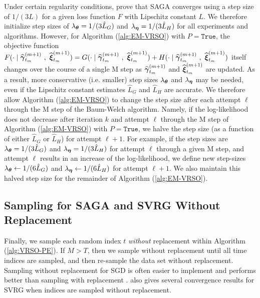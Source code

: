Under certain regularity conditions, \citet{Defazio:2014} prove that SAGA converges using a step size of $1/(3L)$ for a given loss function $F$ with Lipschitz constant $L$. We therefore initialize step sizes of $\lambda_{\boldsymbol{\theta}} = 1/(3 \hat L_G)$ and $\lambda_{\boldsymbol{\eta}} = 1/(3 \hat L_H)$ for all experiments and algorithms. However, for Algorithm (\ref{alg:EM-VRSO}) with $P = \texttt{True}$, the objective function $F(\cdot \mid \widehat {\boldsymbol{\gamma}}_{t_m}^{(m+1)} ~,~ \widehat {\boldsymbol{\xi}}_{t_m}^{(m+1)}) = G(\cdot \mid \widehat {\boldsymbol{\gamma}}_{t_m}^{(m+1)} ~,~ \widehat {\boldsymbol{\xi}}_{t_m}^{(m+1)}) + H(\cdot \mid \widehat {\boldsymbol{\gamma}}_{t_m}^{(m+1)} ~,~ \widehat {\boldsymbol{\xi}}_{t_m}^{(m+1)})$ itself changes over the course of a single M step as $\widehat {\boldsymbol{\gamma}}_{t_m}^{(m+1)}$ and $\widehat {\boldsymbol{\xi}}_{t_m}^{(m+1)}$ are updated. As a result, more conservative (i.e. smaller) step sizes $\lambda_{\boldsymbol{\theta}}$ and $\lambda_{\boldsymbol{\eta}}$ may be needed, even if the Lipschitz constant estimates $\hat L_G$ and $\hat L_H$ are accurate. We therefore allow Algorithm (\ref{alg:EM-VRSO}) to change the step size after each attempt $\ell$ through the M step of the Baum-Welch algorithm. Namely, if the log-likelihood does not decrease after iteration $k$ and attempt $\ell$ through the M step of Algorithm (\ref{alg:EM-VRSO}) with $P = \texttt{True}$, we halve the step size (as a function of either $\hat L_G$ or $\hat L_H$) for attempt $\ell+1$. For example, if the step sizes are $\lambda_{\boldsymbol{\theta}} = 1/(3 \hat L_G)$ and $\lambda_{\boldsymbol{\eta}} = 1/(3 \hat L_H)$ for attempt $\ell$ through a given M step, and attempt $\ell$ results in an increase of the log-likelihood, we define new step-sizes $\lambda_{\boldsymbol{\theta}} \leftarrow 1/(6 \hat L_G)$ and $\lambda_{\boldsymbol{\eta}} \leftarrow 1/(6 \hat L_H)$ for attempt $\ell+1$. We also maintain this halved step size for the remainder of Algorithm (\ref{alg:EM-VRSO}).

\subsection{Sampling for SAGA and SVRG Without Replacement}
\label{subsec:wo_replacement}

Finally, we sample each random index $t$ \textit{without} replacement within Algorithm (\ref{alg:VRSO-PE}). If $M > T$, then we sample without replacement until all time indices are sampled, and then re-sample the data set without replacement. Sampling without replacement for SGD is often easier to implement and performs better than sampling with replacement \citep{Gurbuzbalaban:2015}. \citet{Ohad:2016} also gives several convergence results for SVRG when indices are sampled without replacement.
